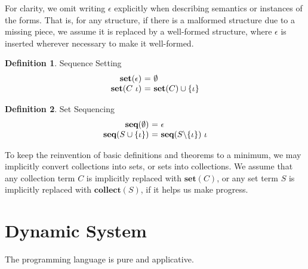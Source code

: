 \documentclass[acmsmall]{acmart}
\theoremstyle{definition}
\newtheorem{definition}{Definition}[section]
\begin{document}
For clarity, we omit writing $\epsilon$ explicitly when describing semantics or instances of the forms.
That is, for any structure, if there is a malformed structure due to a missing piece, 
we assume it is replaced by a well-formed structure, 
where $\epsilon$ is inserted wherever necessary to make it well-formed.


\begin{definition} 
  \label{def:sequence_setting}
  Sequence Setting 
  \hfill 
  \small
  \\
  \[
  \begin{array}[t]{r@{}c@{}l}
      \textbf{set}(\epsilon)
      &\ =\ & 
      \emptyset 

      \\

      \textbf{set}(C\ \iota)
      &\ =\ & 
      \textbf{set}(C) \cup \{ \iota \} 
  \end{array}
  \]
\end{definition} 

\begin{definition} 
  \label{def:set_sequencing}
  Set Sequencing 
  \hfill 
  \small
  \\
  \[
  \begin{array}[t]{r@{}c@{}l}
      \textbf{seq}(\emptyset)
      &\ =\ & 
      \epsilon 

      \\

      \textbf{seq}(S \cup \{\iota\})
      &\ =\ & 
      \textbf{seq}(S \backslash \{\iota\})\ \iota 
  \end{array}
  \]
\end{definition} 

\noindent
To keep the reinvention of basic definitions and theorems to a minimum, 
we may implicitly convert collections into sets, or sets into collections.
We assume that any collection term $C$ is implicitly replaced with $\textbf{set}(C)$,
or any set term $S$ is implicitly replaced with $\textbf{collect}(S)$, if it helps
us make progress.


\section{Dynamic System}
\label{sec:dynamic_system}

The programming language is pure and applicative. 
\end{document}
